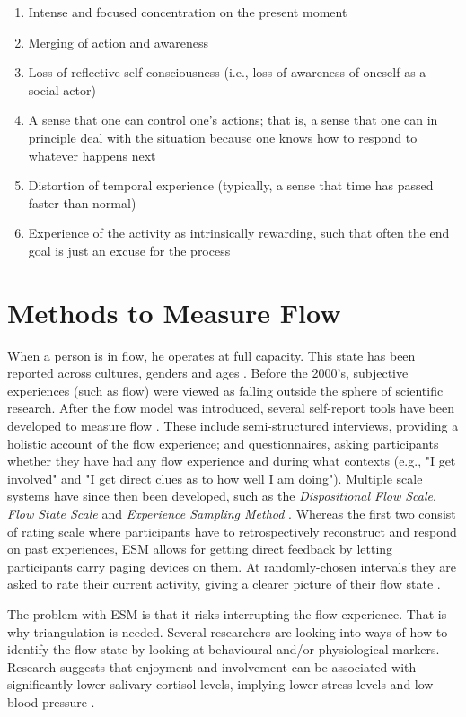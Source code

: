 \begin{enumerate}
\item Intense and focused concentration on the present moment
\item Merging of action and awareness
\item Loss of reflective self-consciousness (i.e., loss of awareness of oneself as a social actor)
\item A sense that one can control one's actions; that is, a sense that one can in principle deal with the situation because one knows how to respond to whatever happens next
\item Distortion of temporal experience (typically, a sense that time has passed faster than normal)
\item Experience of the activity as intrinsically rewarding, such that often the end goal is just an excuse for the process
\end{enumerate}

\section{Methods to Measure Flow}
When a person is in flow, he operates at full capacity. This state has been reported across cultures, genders and ages \citep{flowTwo}. Before the 2000's, subjective experiences (such as flow) were viewed as falling outside the sphere of scientific research. After the flow model was introduced, several self-report tools have been developed to measure flow \citep{flowTwo}. These include semi-structured interviews, providing a holistic account of the flow experience; and questionnaires, asking participants whether they have had any flow experience and during what contexts (e.g., "I get involved" and "I get direct clues as to how well I am doing"). Multiple scale systems have since then been developed, such as the \textit{Dispositional Flow Scale}, \textit{Flow State Scale} and \textit{Experience Sampling Method} \citep{flowTwo}. Whereas the first two consist of rating scale where participants have to retrospectively reconstruct and respond on past experiences, ESM allows for getting direct feedback by letting participants carry paging devices on them. At randomly-chosen intervals they are asked to rate their current activity, giving a clearer picture of their flow state \citep{flowTwo}.

The problem with ESM is that it risks interrupting the flow experience. That is why triangulation is needed. Several researchers are looking into ways of how to identify the flow state by looking at behavioural and/or physiological markers. Research suggests that enjoyment and involvement can be associated with significantly lower salivary cortisol levels, implying lower stress levels and low blood pressure \citep{flowTwo}.

